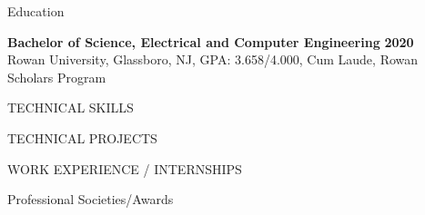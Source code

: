 \documentclass{classes/resume} %
\begin{document}
\begin{rSection}{Education}

  {\bf Bachelor of Science, Electrical and Computer Engineering} \hfill
  {\bf {} {\May}{2020}}
  \\
  Rowan University, Glassboro, NJ,  GPA:  3.658/4.000, Cum Laude, Rowan Scholars Program

\end{rSection}


\begin{rSection}{TECHNICAL SKILLS}

  {\skills}

\end{rSection}


\begin{rSection}{TECHNICAL PROJECTS}
  \projects

\end{rSection}



\begin{rSection}{WORK EXPERIENCE / INTERNSHIPS} \itemsep -3pt
    \WorkExperience
\end{rSection}

\begin{rSection}{Professional Societies/Awards} \itemsep -3pt
    \SocietiesAndAwards
\end{rSection}
\end{document}
